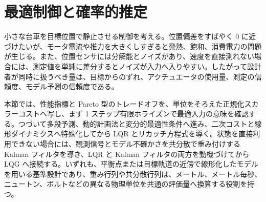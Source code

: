 \section{最適制御と確率的推定}

小さな台車を目標位置で静止させる制御を考える。位置偏差をすばやく 0 に近づけたいが、モータ電流や推力を大きくしすぎると発熱、飽和、消費電力の問題が生じる。また、位置センサには分解能とノイズがあり、速度を直接測れない場合には、測定値を単純に差分するとノイズが入力へ入りやすい。したがって設計者が同時に扱うべき量は、目標からのずれ、アクチュエータの使用量、測定の信頼度、モデル予測の信頼度である。

本節では、性能指標と Pareto 型のトレードオフを、単位をそろえた正規化スカラーコストへ写し、まず 1 ステップ有限ホライズンで最適入力の意味を確認する。つづいて多段予測、動的計画法と変分的最適性条件へ進み、二次コストと線形ダイナミクスへ特殊化してから LQR とリカッチ方程式を導く。状態を直接利用できない場合には、観測信号とモデル不確かさを共分散で重み付けする Kalman フィルタを導き、LQR と Kalman フィルタの両方を動機づけてから LQG へ接続する。いずれも、平衡点または目標軌道の近傍で線形化したモデルを用いる基準設計であり、重み行列や共分散行列は、メートル、メートル毎秒、ニュートン、ボルトなどの異なる物理単位を共通の評価量へ換算する役割を持つ。






